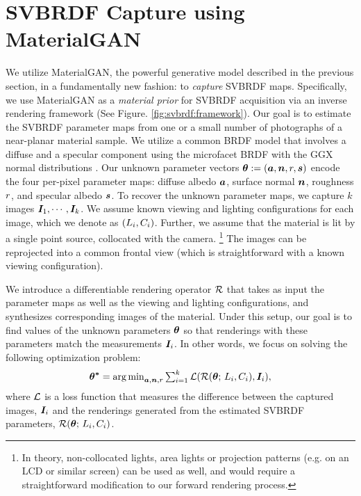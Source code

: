 \section{SVBRDF Capture using MaterialGAN}
\label{sec:svbrdf:framework}



We utilize MaterialGAN, the powerful generative model described in the previous section, in a fundamentally new fashion: to \emph{capture} SVBRDF maps.
Specifically, we use MaterialGAN as a \emph{material prior} for SVBRDF acquisition via an inverse rendering framework (See Figure. \ref{fig:svbrdf:framework}).
Our goal is to estimate the SVBRDF parameter maps from one or a small number of photographs of a near-planar material sample.
We utilize a common BRDF model that involves a diffuse and a specular component using the microfacet BRDF with the GGX normal distributions \cite{Walter07}.
Our unknown parameter vectors $\bm{\theta} := (\bm{a},\bm{n},r,\bm{s})$ encode the four per-pixel parameter maps: diffuse albedo $\bm{a}$, surface normal $\bm{n}$, roughness $r$, and specular albedo $\bm{s}$.
To recover the unknown parameter maps, we capture $k$ images $\bm{I}_1, \cdots, \bm{I}_k$.
We assume known viewing and lighting configurations for each image, which we denote as $(L_i, C_i)$.
Further, we assume that the material is lit by a single point source, collocated with the camera.
\footnote{
	In theory, non-collocated lights, area lights or projection patterns (e.g. on an LCD or similar screen) can be used as well, and would require a straightforward modification to our forward rendering process.
}
The images can be reprojected into a common frontal view (which is straightforward with a known viewing configuration).

We introduce a differentiable rendering operator $\mathcal{R}$ that takes as input the parameter maps as well as the viewing and lighting configurations, and synthesizes corresponding images of the material.
Under this setup, our goal is to find values of the unknown parameters $\bm{\theta}$ so that renderings with these parameters match the measurements $\bm{I}_i$.
In other words, we focus on solving the following optimization problem:
\begin{equation}
	\label{eq:opt1}
	\bm{\theta^{*}} = \textstyle\operatorname*{arg\,min}_{\bm{a}, \bm{n}, r} \sum_{i=1}^k \mathcal{L}(\mathcal{R}(\bm{\theta}; \,L_i, C_i), \bm{I}_i),
\end{equation}
where $\mathcal{L}$ is a loss function that measures the difference between the captured images, $\bm{I}_i$ and the renderings generated from the estimated SVBRDF parameters, $\mathcal{R}(\bm{\theta}; \,L_i, C_i)$.


